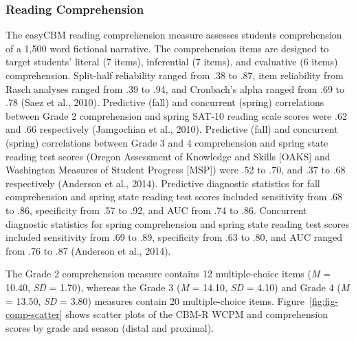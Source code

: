 \documentclass[
  english,
  man, fleqn, noextraspace]{apa6}
\begin{document}
\hypertarget{reading-comprehension}{%
\subsubsection{Reading Comprehension}\label{reading-comprehension}}

The easyCBM reading comprehension measure assesses students comprehension of a 1,500 word fictional narrative. The comprehension items are designed to target students' literal (7 items), inferential (7 items), and evaluative (6 items) comprehension. Split-half reliability ranged from .38 to .87, item reliability from Rasch analyses ranged from .39 to .94, and Cronbach's alpha ranged from .69 to .78 (Saez et al., 2010). Predictive (fall) and concurrent (spring) correlations between Grade 2 comprehension and spring SAT-10 reading scale scores were .62 and .66 respectively (Jamgochian et al., 2010). Predictive (fall) and concurrent (spring) correlations between Grade 3 and 4 comprehension and spring state reading test scores (Oregon Assessment of Knowledge and Skills {[}OAKS{]} and Washington Measures of Student Progress {[}MSP{]}) were .52 to .70, and .37 to .68 respectively (Anderson et al., 2014). Predictive diagnostic statistics for fall comprehension and spring state reading test scores included sensitivity from .68 to .86, specificity from .57 to .92, and AUC from .74 to .86. Concurrent diagnostic statistics for spring comprehension and spring state reading test scores included sensitivity from .69 to .89, specificity from .63 to .80, and AUC ranged from .76 to .87 (Anderson et al., 2014).

The Grade 2 comprehension measure contains 12 multiple-choice items (\emph{M} = 10.40, \emph{SD} = 1.70), whereas the Grade 3 (\emph{M} = 14.10, \emph{SD} = 4.10) and Grade 4 (\emph{M} = 13.50, \emph{SD} = 3.80) measures contain 20 multiple-choice items. Figure~\ref{fig:fig-comp-scatter} shows scatter plots of the CBM-R WCPM and comprehension scores by grade and season (distal and proximal).
\end{document}
